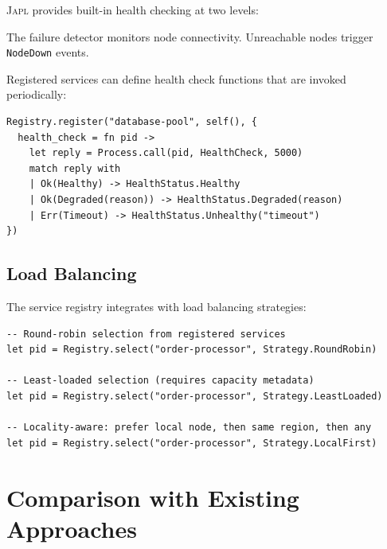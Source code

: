 \documentclass[11pt,a4paper]{article}
\newcommand{\japl}{\textsc{Japl}}
\begin{document}
\japl{} provides built-in health checking at two levels:

\begin{description}[nosep]
  \item[Node-level:] The failure detector monitors node connectivity.
    Unreachable nodes trigger \texttt{NodeDown} events.
  \item[Service-level:] Registered services can define health check
    functions that are invoked periodically:
\end{description}

\begin{lstlisting}
Registry.register("database-pool", self(), {
  health_check = fn pid ->
    let reply = Process.call(pid, HealthCheck, 5000)
    match reply with
    | Ok(Healthy) -> HealthStatus.Healthy
    | Ok(Degraded(reason)) -> HealthStatus.Degraded(reason)
    | Err(Timeout) -> HealthStatus.Unhealthy("timeout")
})
\end{lstlisting}

\subsection{Load Balancing}

The service registry integrates with load balancing strategies:

\begin{lstlisting}
-- Round-robin selection from registered services
let pid = Registry.select("order-processor", Strategy.RoundRobin)

-- Least-loaded selection (requires capacity metadata)
let pid = Registry.select("order-processor", Strategy.LeastLoaded)

-- Locality-aware: prefer local node, then same region, then any
let pid = Registry.select("order-processor", Strategy.LocalFirst)
\end{lstlisting}


\section{Comparison with Existing Approaches}
\label{sec:comparison}
\end{document}

